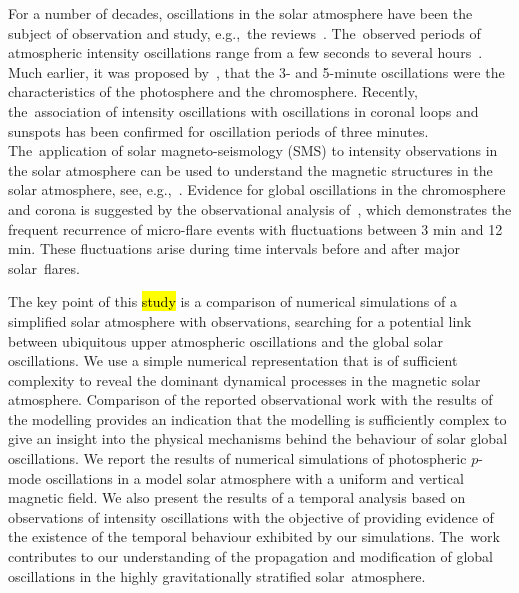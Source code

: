 \documentclass[physics,article,accept,pdftex,moreauthors]{Definitions/mdpi}
\begin{document}
 For a number of decades, oscillations in the solar atmosphere have been the subject of observation and study, e.g.,~the reviews~\cite{Banerjee2011,deMoortel2009,Mathioudakis2013,Ruderman2009,Wang2011}. The~observed periods of atmospheric intensity oscillations range from  a few seconds to several hours~\cite{Auchere2014}. Much earlier, it was proposed by~\cite{Jensen1963}, that the 3- and 5-minute oscillations were the characteristics of the photosphere and the chromosphere. Recently, the~association of intensity oscillations with oscillations in coronal loops and sunspots has been confirmed for oscillation periods of three minutes. The~application of solar magneto-seismology (SMS) to intensity observations in the solar atmosphere can be used to understand the magnetic structures in the solar atmosphere, see, e.g.,~\cite{Roberts1984,Banerjee2007,Zaqarashvili2007,Erdelyi2008,Verth2010}.  Evidence for global oscillations  in the chromosphere and corona is suggested by the observational analysis of~\cite{Gyenge2018},  which demonstrates the frequent recurrence of micro-flare events with fluctuations between 3 min and 12 min. These fluctuations arise during time intervals before and after major solar~flares.


The key point of this %
 \hl{study}  
is a comparison of numerical simulations  of a simplified solar atmosphere with observations, searching for a  potential link between ubiquitous upper atmospheric oscillations and the global solar oscillations. We use a  simple numerical representation that is of sufficient complexity to reveal the dominant dynamical processes in the magnetic solar atmosphere. Comparison of the reported observational work with the results of the modelling provides an indication that the modelling is sufficiently complex to give an insight into the physical mechanisms behind the behaviour of solar global oscillations. We report the results of numerical simulations of photospheric $p$-mode oscillations in a model solar atmosphere with a uniform and vertical magnetic field. We also present the results of a temporal analysis based on observations of intensity oscillations with the objective of providing evidence of the existence of the temporal behaviour exhibited by our simulations. The~work contributes to our understanding of the propagation and modification of global oscillations in the highly gravitationally stratified solar~atmosphere. 




\end{document}
